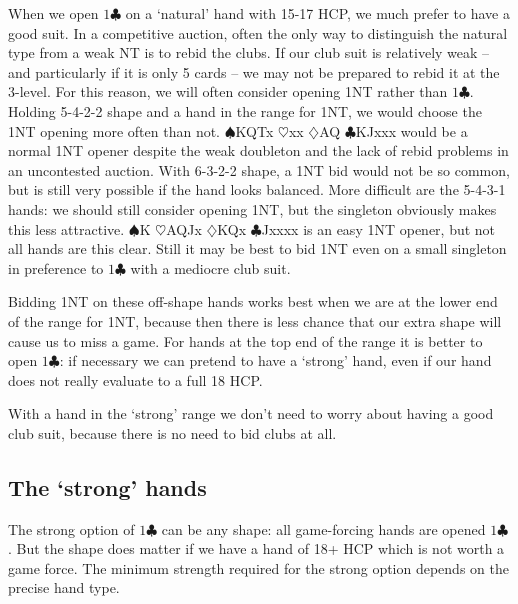 \documentclass{article}
\newcommand{\sz}{\spadesuit}
\newcommand{\hz}{\heartsuit}
\newcommand{\dz}{\diamondsuit}
\newcommand{\cz}{\clubsuit}
\begin{document}
When we open $1\cz$ on a `natural' hand with 15-17 HCP, we much prefer to have a good suit. In a competitive auction, often the only way to distinguish the natural type from a weak NT is to rebid the clubs. If our club suit is relatively weak -- and particularly if it is only 5 cards -- we may not be prepared to rebid it at the 3-level. For this reason, we will often consider opening 1NT rather than $1\cz$. Holding 5-4-2-2 shape and a hand in the range for 1NT, we would choose the 1NT opening more often than not. $\sz$KQTx $\hz$xx $\dz$AQ $\cz$KJxxx would be a normal 1NT opener despite the weak doubleton and the lack of rebid problems in an uncontested auction. With 6-3-2-2 shape, a 1NT bid would not be so common, but is still very possible if the hand looks balanced. More difficult are the 5-4-3-1 hands: we should still consider opening 1NT, but the singleton obviously makes this less attractive. $\sz$K $\hz$AQJx $\dz$KQx $\cz$Jxxxx is an easy 1NT opener, but not all hands are this clear. Still it may be best to bid 1NT even on a small singleton in preference to $1\cz$ with a mediocre club suit.

Bidding 1NT on these off-shape hands works best when we are at the lower end of the range for 1NT, because then there is less chance that our extra shape will cause us to miss a game. For hands at the top end of the range it is better to open $1\cz$: if necessary we can pretend to have a `strong' hand, even if our hand does not really evaluate to a full 18 HCP.

With a hand in the `strong' range we don't need to worry about having a good club suit, because there is no need to bid clubs at all.

\subsection{The `strong' hands}

The strong option of $1\cz$ can be any shape: all game-forcing hands are opened $1\cz$. But the shape does matter if we have a hand of 18+ HCP which is not worth a game force. The minimum strength required for the strong option depends on the precise hand type.
\end{document}
